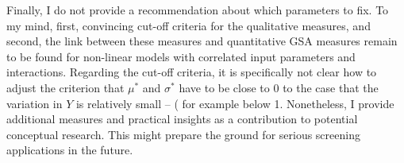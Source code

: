 \noindent
Finally, I do not provide a recommendation about which parameters to fix. To my mind, first, convincing cut-off criteria for the qualitative measures, and second, the link between these measures and quantitative GSA measures remain to be found for non-linear models with correlated input parameters and interactions. Regarding the cut-off criteria, it is specifically not clear how to adjust the criterion that $\mu^{*}$ and $\sigma^{*}$ have to be close to $0$ to the case that the variation in $Y$ is relatively small -- \left( for example below 1. Nonetheless, I provide additional measures and practical insights as a contribution to potential conceptual research. This might prepare the ground for serious screening applications in the future.




